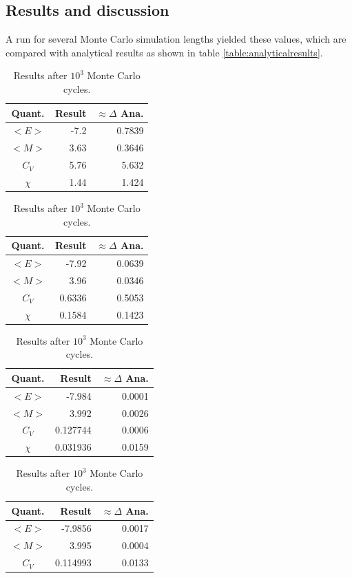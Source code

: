 \documentclass[11pt,a4paper,notitlepage,twocolumn]{article}
\begin{document}
\subsection{Results and discussion}\label{disc:ana_results}
A run for several Monte Carlo simulation lengths yielded these values, which are compared with analytical results as shown in table \ref{table:analyticalresults}.
\begin{table}[H]\center
\begin{tabular}{|c|r|r|}\hline
	Quant.& Result & $\approx\Delta$ Ana.\\ \hline
	$<E>$ &-7.2    & 0.7839 \\ \hline
	$<M>$ & 3.63   & 0.3646 \\ \hline
	$C_V$ & 5.76   & 5.632 \\ \hline
	$\chi$& 1.44   & 1.424 \\ \hline
\end{tabular}
\caption{Results after $10^1$ Monte Carlo cycles.}\label{table:4bresults10}
\begin{tabular}{|c|r|r|}\hline
	Quant.& Result & $\approx\Delta$ Ana.\\ \hline
	$<E>$ &-7.92   & 0.0639 \\ \hline
	$<M>$ & 3.96   & 0.0346 \\ \hline
	$C_V$ & 0.6336   & 0.5053 \\ \hline
	$\chi$& 0.1584   & 0.1423 \\ \hline
\end{tabular}
\caption{Results after $10^2$ Monte Carlo cycles.}\label{table:4bresults100}
\begin{tabular}{|c|r|r|}\hline
	Quant.& Result & $\approx\Delta$ Ana.\\ \hline
	$<E>$ &-7.984  & 0.0001 \\ \hline
	$<M>$ & 3.992  & 0.0026 \\ \hline
	$C_V$ & 0.127744 & 0.0006 \\ \hline
	$\chi$& 0.031936 & 0.0159 \\ \hline
\end{tabular}
\caption{Results after $10^3$ Monte Carlo cycles.}\label{table:4bresults1000}
\begin{tabular}{|c|r|r|}\hline
	Quant.& Result & $\approx\Delta$ Ana.\\ \hline
	$<E>$ &-7.9856    & 0.0017 \\ \hline
	$<M>$ & 3.995    & 0.0004 \\ \hline
	$C_V$ & 0.114993   & 0.0133 \\ \hline

\end{tabular}
\end{table}
\end{document}
